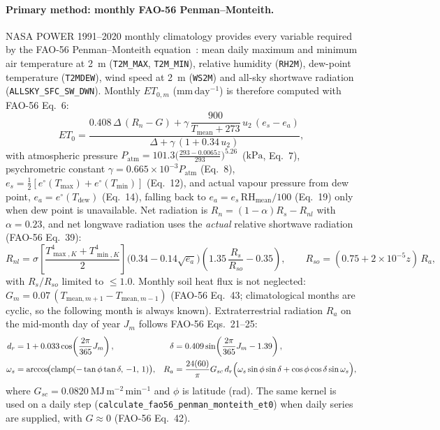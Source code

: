 \paragraph{Primary method: monthly FAO-56 Penman--Monteith.}
NASA POWER 1991--2020 monthly climatology provides every variable required by the FAO-56 Penman--Monteith equation~\cite{allen1998fao56,nasapower2024}: mean daily maximum and minimum air temperature at 2~m (\texttt{T2M\_MAX}, \texttt{T2M\_MIN}), relative humidity (\texttt{RH2M}), dew-point temperature (\texttt{T2MDEW}), wind speed at 2~m (\texttt{WS2M}) and all-sky shortwave radiation (\texttt{ALLSKY\_SFC\_SW\_DWN}). Monthly $ET_{0,m}$ ($\mathrm{mm\,day^{-1}}$) is therefore computed with FAO-56 Eq.~6:
\begin{equation}
  ET_0 = \frac{0.408\,\Delta\,(R_n - G) + \gamma\,\dfrac{900}{T_{\mathrm{mean}} + 273}\, u_2 \,(e_s - e_a)}{\Delta + \gamma\,(1 + 0.34\, u_2)},
\end{equation}
with atmospheric pressure $P_{\mathrm{atm}} = 101.3 \bigl(\frac{293 - 0.0065 z}{293}\bigr)^{5.26}$~($\mathrm{kPa}$, Eq.~7), psychrometric constant $\gamma = 0.665\times 10^{-3} P_{\mathrm{atm}}$ (Eq.~8), $e_s = \tfrac{1}{2}[e^{\circ}(T_{\max}) + e^{\circ}(T_{\min})]$ (Eq.~12), and actual vapour pressure from dew point, $e_a = e^{\circ}(T_{\mathrm{dew}})$ (Eq.~14), falling back to $e_a = e_s\,\mathrm{RH}_{\mathrm{mean}}/100$ (Eq.~19) only when dew point is unavailable. Net radiation is $R_n = (1-\alpha)R_s - R_{nl}$ with $\alpha = 0.23$, and net longwave radiation uses the \emph{actual} relative shortwave radiation (FAO-56 Eq.~39):
\begin{equation}
  R_{nl} = \sigma \left[\frac{T_{\max,K}^4 + T_{\min,K}^4}{2}\right]\bigl(0.34 - 0.14\sqrt{e_a}\bigr)\left(1.35\,\frac{R_s}{R_{so}} - 0.35\right), \qquad R_{so} = (0.75 + 2\times10^{-5} z)\,R_a,
\end{equation}
with $R_s/R_{so}$ limited to $\le 1.0$. Monthly soil heat flux is not neglected: $G_m = 0.07\,(T_{\mathrm{mean},m+1} - T_{\mathrm{mean},m-1})$ (FAO-56 Eq.~43; climatological months are cyclic, so the following month is always known). Extraterrestrial radiation $R_a$ on the mid-month day of year $J_m$ follows FAO-56 Eqs.~21--25:
\begin{align}
  d_r &= 1 + 0.033 \cos\!\left(\frac{2\pi}{365} J_m\right), &
  \delta &= 0.409 \sin\!\left(\frac{2\pi}{365} J_m - 1.39\right), \\
  \omega_s &= \arccos\!\bigl(\operatorname{clamp}(-\tan\phi \tan\delta,\, -1,\, 1)\bigr), &
  R_a &= \frac{24(60)}{\pi} G_{sc}\, d_r \Bigl(\omega_s \sin\phi\sin\delta + \cos\phi\cos\delta\sin\omega_s\Bigr),
\end{align}
where $G_{sc} = 0.0820~\mathrm{MJ\,m^{-2}\,min^{-1}}$ and $\phi$ is latitude (rad). The same kernel is used on a daily step (\texttt{calculate\_\allowbreak fao56\_\allowbreak penman\_\allowbreak monteith\_et0}) when daily series are supplied, with $G \approx 0$ (FAO-56 Eq.~42).

